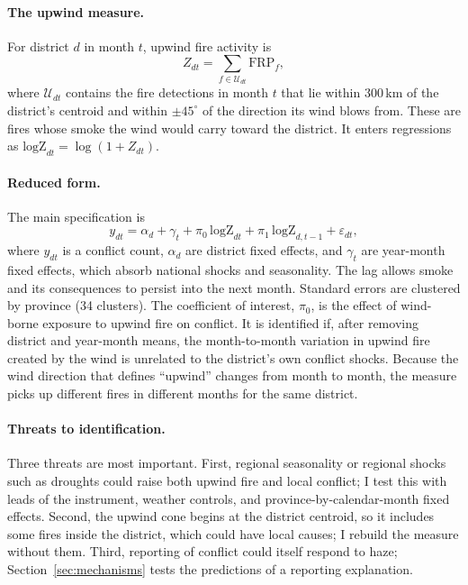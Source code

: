 \documentclass[12pt]{article}
\begin{document}
\paragraph{The upwind measure.} For district $d$ in month $t$, upwind fire activity is
\[
Z_{dt} = \sum_{f \in \mathcal{U}_{dt}} \text{FRP}_f,
\]
where $\mathcal{U}_{dt}$ contains the fire detections in month $t$ that lie within 300\,km of the district's centroid and within $\pm 45^{\circ}$ of the direction its wind blows from. These are fires whose smoke the wind would carry toward the district. It enters regressions as $\text{logZ}_{dt} = \log(1+Z_{dt})$.

\paragraph{Reduced form.} The main specification is
\begin{equation}
y_{dt} = \alpha_d + \gamma_t + \pi_0\, \text{logZ}_{dt} + \pi_1\, \text{logZ}_{d,t-1} + \varepsilon_{dt},
\label{eq:rf}
\end{equation}
where $y_{dt}$ is a conflict count, $\alpha_d$ are district fixed effects, and $\gamma_t$ are year-month fixed effects, which absorb national shocks and seasonality. The lag allows smoke and its consequences to persist into the next month. Standard errors are clustered by province (34 clusters). The coefficient of interest, $\pi_0$, is the effect of wind-borne exposure to upwind fire on conflict. It is identified if, after removing district and year-month means, the month-to-month variation in upwind fire created by the wind is unrelated to the district's own conflict shocks. Because the wind direction that defines ``upwind'' changes from month to month, the measure picks up different fires in different months for the same district.

\paragraph{Threats to identification.} Three threats are most important. First, regional seasonality or regional shocks such as droughts could raise both upwind fire and local conflict; I test this with leads of the instrument, weather controls, and province-by-calendar-month fixed effects. Second, the upwind cone begins at the district centroid, so it includes some fires inside the district, which could have local causes; I rebuild the measure without them. Third, reporting of conflict could itself respond to haze; Section~\ref{sec:mechanisms} tests the predictions of a reporting explanation.
\end{document}
